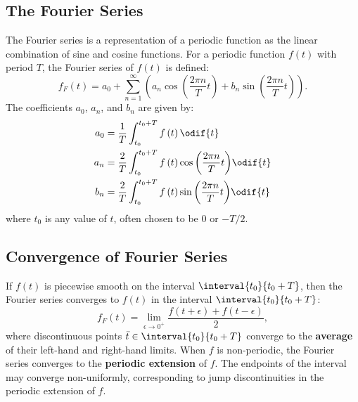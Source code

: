 \documentclass{article}
\begin{document}
\subsection{The Fourier Series}
The Fourier series is a representation of a periodic function as the
linear combination of sine and cosine functions. For a periodic
function \(f\left( t \right)\) with period \(T\), the Fourier series of
\(f\left( t \right)\) is defined:
\begin{equation*}
    f_F\left( t \right) = a_0 + \sum_{n=1}^{\infty} \left( a_n \cos{\left( \frac{2\pi n}{T} t \right)} + b_n \sin{\left( \frac{2\pi n}{T} t \right)} \right).
\end{equation*}
The coefficients \(a_0\), \(a_n\), and \(b_n\) are given by:
\begin{align*}
    a_0 & = \frac{1}{T} \int_{t_0}^{t_0 + T} f\left( t \right) \odif{t}                                         \\
    a_n & = \frac{2}{T} \int_{t_0}^{t_0 + T} f\left( t \right) \cos{\left( \frac{2\pi n}{T} t \right)} \odif{t} \\
    b_n & = \frac{2}{T} \int_{t_0}^{t_0 + T} f\left( t \right) \sin{\left( \frac{2\pi n}{T} t \right)} \odif{t}
\end{align*}
where \(t_0\) is any value of \(t\), often chosen to be \(0\) or \(-T/2\).
\subsection{Convergence of Fourier Series}
If \(f\left( t \right)\) is piecewise smooth on the interval
\(\interval{t_0}{t_0 + T}\), then the Fourier series converges to
\(f\left( t \right)\) in the interval \(\interval{t_0}{t_0 + T}\):
\begin{equation*}
    f_F\left( t \right) = \lim_{\epsilon \to 0^{+}} \frac{f\left( t + \epsilon \right) + f\left( t - \epsilon \right)}{2},
\end{equation*}
where discontinuous points \(\bar{t} \in
\interval{t_0}{t_0 + T}\) converge to the \textbf{average} of their
left-hand and right-hand limits. When \(f\) is non-periodic, the
Fourier series converges to the \textbf{periodic extension} of \(f\).
The endpoints of the interval may converge non-uniformly, corresponding
to jump discontinuities in the periodic extension of \(f\).
\end{document}
